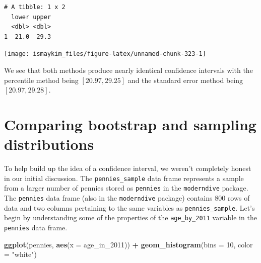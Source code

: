 \documentclass[12pt,]{krantz}
\makeatletter
\newenvironment{Shaded}{\begin{snugshade}}{\end{snugshade}}
\newcommand{\KeywordTok}[1]{\textcolor[rgb]{0.27,0.27,0.27}{\textbf{#1}}}
\newcommand{\DataTypeTok}[1]{\textcolor[rgb]{0.27,0.27,0.27}{#1}}
\newcommand{\DecValTok}[1]{\textcolor[rgb]{0.06,0.06,0.06}{#1}}
\newcommand{\StringTok}[1]{\textcolor[rgb]{0.5,0.5,0.5}{#1}}
\newcommand{\OperatorTok}[1]{\textcolor[rgb]{0.43,0.43,0.43}{\textbf{#1}}}
\newcommand{\NormalTok}[1]{#1}
\newenvironment{kframe}{%
\medskip{}
\setlength{\fboxsep}{.8em}
 \def\at@end@of@kframe{}%
 \ifinner\ifhmode%
  \def\at@end@of@kframe{\end{minipage}}%
  \begin{minipage}{\columnwidth}%
 \fi\fi%
 \def\FrameCommand##1{\hskip\@totalleftmargin \hskip-\fboxsep
 \colorbox{shadecolor}{##1}\hskip-\fboxsep
     \hskip-\linewidth \hskip-\@totalleftmargin \hskip\columnwidth}%
 \MakeFramed {\advance\hsize-\width
   \@totalleftmargin\z@ \linewidth\hsize
   \@setminipage}}%
 {\par\unskip\endMakeFramed%
 \at@end@of@kframe}
\renewenvironment{Shaded}{\begin{kframe}}{\end{kframe}}
\makeatother
\begin{document}
\begin{verbatim}
# A tibble: 1 x 2
  lower upper
  <dbl> <dbl>
1  21.0  29.3
\end{verbatim}

\begin{Shaded}
\end{Shaded}

\begin{center}\texttt{[image: ismaykim\_files/figure-latex/unnamed-chunk-323-1]} \end{center}

We see that both methods produce nearly identical confidence intervals
with the percentile method being \([20.97, 29.25]\) and the standard
error method being \([20.97, 29.28]\).

\section{Comparing bootstrap and sampling
distributions}\label{comparing-bootstrap-and-sampling-distributions}

To help build up the idea of a confidence interval, we weren't
completely honest in our initial discussion. The
\texttt{pennies\_sample} data frame represents a sample from a larger
number of pennies stored as \texttt{pennies} in the \texttt{moderndive}
package. The \texttt{pennies} data frame (also in the
\texttt{moderndive} package) contains 800 rows of data and two columns
pertaining to the same variables as \texttt{pennies\_sample}. Let's
begin by understanding some of the properties of the
\texttt{age\_by\_2011} variable in the \texttt{pennies} data frame.

\begin{Shaded}
\begin{Highlighting}[]
\KeywordTok{ggplot}\NormalTok{(pennies, }\KeywordTok{aes}\NormalTok{(}\DataTypeTok{x =}\NormalTok{ age_in_}\DecValTok{2011}\NormalTok{)) }\OperatorTok{+}
\StringTok{  }\KeywordTok{geom_histogram}\NormalTok{(}\DataTypeTok{bins =} \DecValTok{10}\NormalTok{, }\DataTypeTok{color =} \StringTok{"white"}\NormalTok{)}
\end{Highlighting}
\end{Shaded}
\end{document}
